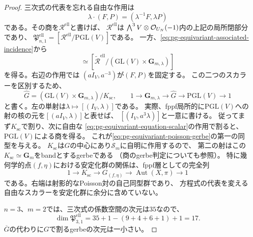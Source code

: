 \begin{proof}
三次式の代表を忘れる自由な作用は
\begin{equation}
 \lambda\cdot(F,P)=(\lambda^{-1}F,\lambda P)
 \label{eq:pg-equivariant-equation-scalar}
\end{equation}
である。その商を$\mathscr R^{\mathrm{ell}}$と書けば、
$\mathscr R^{\mathrm{ell}}$は
$\bigwedge^3V\otimes\mathcal O_{U_N}(-1)$内の上記の局所閉部分であり、
$\mathfrak P_{n,1}^{\mathrm{ell}}
 =[\mathscr R^{\mathrm{ell}}/\mathrm{PGL}(V)]$である。
一方、\eqref{eq:pg-equivariant-associated-incidence}から
\begin{equation}
 [\mathscr S_m/G]
 \simeq
 [\widetilde{\mathscr R}^{\mathrm{ell}}/
       (\mathrm{GL}(V)\times\mathbf G_{m,\lambda})]
 \label{eq:pg-equivariant-two-quotients}
\end{equation}
を得る。右辺の作用では
$(aI_V,a^{-3})$が$(F,P)$を固定する。
この二つのスカラーを区別するため、
\begin{equation}
 \widehat G=(\mathrm{GL}(V)\times\mathbf G_{m,\lambda})/K_{\mathrm{sc}},
 \qquad
 1\longrightarrow\mathbf G_{m,\lambda}
 \longrightarrow\widehat G
 \longrightarrow\mathrm{PGL}(V)\longrightarrow1
 \label{eq:pg-equivariant-effective-group-sequence}
\end{equation}
と書く。左の単射は$\lambda\mapsto[(I_V,\lambda)]$である。
実際、fppf局所的に$\mathrm{PGL}(V)$への射の核の元を$[(aI_V,\lambda)]$と表せば、
$[(I_V,a^3\lambda)]$と一意に書ける。
従ってまず$K_{\mathrm{sc}}$で割り、次に自由な
\eqref{eq:pg-equivariant-equation-scalar}の作用で割ると、
$\mathrm{PGL}(V)$による商を得る。
これが\eqref{eq:pg-equivariant-poisson-gerbe}の第一の同型を与える。
$K_{\mathrm{sc}}$は$G$の中心にあり$\mathscr S_m$に自明に作用するので、
第二の射はこの$K_{\mathrm{sc}}\simeq\mathbf G_m$をbandとするgerbeである
（商のgerbe判定について\cite[Lemma~78.27.1, Tag~\texttt{06PD}]{PStacks}も参照）。
特に幾何学的点$(f,\eta)$における安定化群の関係は、fppf層としての完全列
\begin{equation}
 1\longrightarrow K_{\mathrm{sc}}
 \longrightarrow G_{(f,\eta)}
 \longrightarrow\operatorname{Aut}(X,\pi)\longrightarrow1
 \label{eq:pg-equivariant-stabilizer-sequence}
\end{equation}
である。右端は射影的なPoisson対の自己同型群であり、
方程式の代表を変える自由なスカラーを安定化群に余分に含めていない。

$n=3$、$m=2$では、三次式の係数空間の次元は$35$なので、
\begin{equation}
 \dim\mathfrak P_{3,1}^{\mathrm{ell}}
 =35+1-(9+4+6+1)+1=17.
 \label{eq:pg-equivariant-threefold-stack-dimension}
\end{equation}
$\overline G$の代わりに$G$で割るgerbeの次元は一小さい。
\end{proof}

